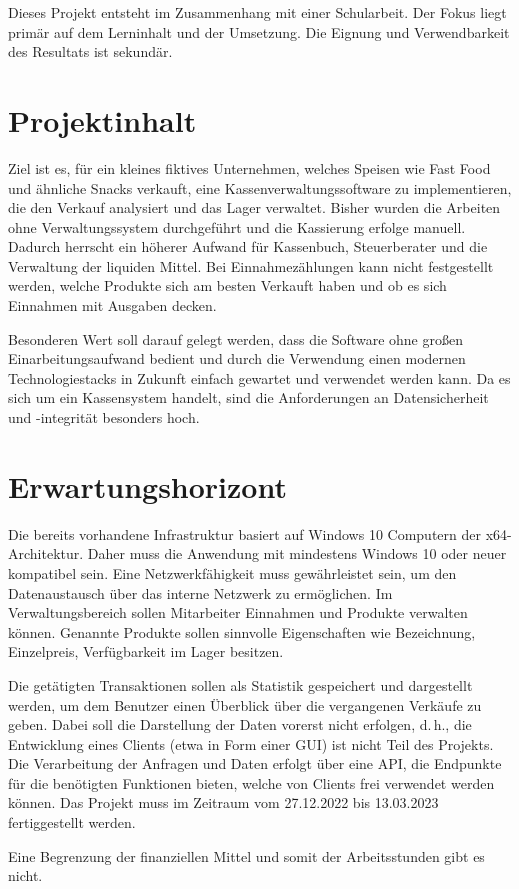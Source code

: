Dieses Projekt entsteht im Zusammenhang mit einer Schularbeit. Der Fokus liegt primär auf dem Lerninhalt und der Umsetzung. Die Eignung und Verwendbarkeit des Resultats ist sekundär.

\section{Projektinhalt}
Ziel ist es, für ein kleines fiktives Unternehmen, welches Speisen wie Fast Food und ähnliche Snacks verkauft, eine Kassenverwaltungssoftware zu implementieren, die den Verkauf analysiert und das Lager verwaltet.
Bisher wurden die Arbeiten ohne Verwaltungssystem durchgeführt und die Kassierung erfolge manuell.
Dadurch herrscht ein höherer Aufwand für Kassenbuch, Steuerberater und die Verwaltung der liquiden Mittel.
Bei Einnahmezählungen kann nicht festgestellt werden, welche Produkte sich am besten Verkauft haben und ob es sich Einnahmen mit Ausgaben decken.

Besonderen Wert soll darauf gelegt werden, dass die Software ohne großen Einarbeitungsaufwand bedient und durch die Verwendung einen modernen Technologiestacks in Zukunft einfach gewartet und verwendet werden kann.
Da es sich um ein Kassensystem handelt, sind die Anforderungen an Datensicherheit und -integrität besonders hoch.

\section{Erwartungshorizont}
Die bereits vorhandene Infrastruktur basiert auf Windows 10 Computern der x64-Architektur.
Daher muss die Anwendung mit mindestens Windows 10 oder neuer kompatibel sein.
Eine Netzwerkfähigkeit muss gewährleistet sein, um den Datenaustausch über das interne Netzwerk zu ermöglichen.
Im Verwaltungsbereich sollen Mitarbeiter Einnahmen und Produkte verwalten können.
Genannte Produkte sollen sinnvolle Eigenschaften wie Bezeichnung, Einzelpreis, Verfügbarkeit im Lager besitzen.

Die getätigten Transaktionen sollen als Statistik gespeichert und dargestellt werden, um dem Benutzer einen Überblick über die vergangenen Verkäufe zu geben.
Dabei soll die Darstellung der Daten vorerst nicht erfolgen, d.\,h., die Entwicklung eines Clients (etwa in Form einer GUI) ist nicht Teil des Projekts.
Die Verarbeitung der Anfragen und Daten erfolgt über eine API, die Endpunkte für die benötigten Funktionen bieten, welche von Clients frei verwendet werden können.
Das Projekt muss im Zeitraum vom 27.12.2022 bis 13.03.2023 fertiggestellt werden.

Eine Begrenzung der finanziellen Mittel und somit der Arbeitsstunden gibt es nicht.